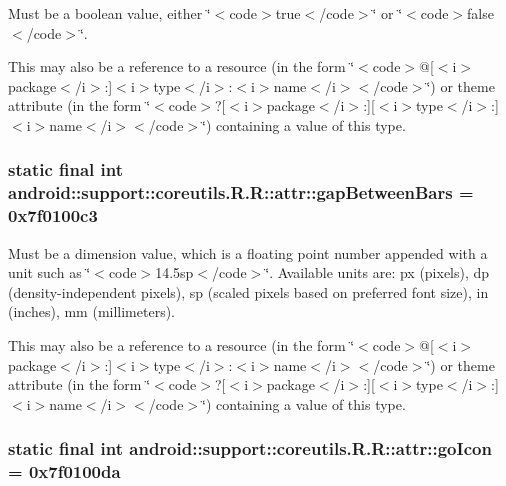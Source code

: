 Must be a boolean value, either \char`\"{}$<$code$>$true$<$/code$>$\char`\"{} or \char`\"{}$<$code$>$false$<$/code$>$\char`\"{}. 

This may also be a reference to a resource (in the form \char`\"{}$<$code$>$@\mbox{[}$<$i$>$package$<$/i$>$:\mbox{]}$<$i$>$type$<$/i$>$:$<$i$>$name$<$/i$>$$<$/code$>$\char`\"{}) or theme attribute (in the form \char`\"{}$<$code$>$?\mbox{[}$<$i$>$package$<$/i$>$:\mbox{]}\mbox{[}$<$i$>$type$<$/i$>$:\mbox{]}$<$i$>$name$<$/i$>$$<$/code$>$\char`\"{}) containing a value of this type. \hypertarget{classandroid_1_1support_1_1coreutils_1_1_r_1_1attr_387aafc8cc5a6e4f98bfead340496098}{
\subsubsection[{gapBetweenBars}]{\setlength{\rightskip}{0pt plus 5cm}static final int android::support::coreutils.R.R::attr::gapBetweenBars = 0x7f0100c3}}
\label{classandroid_1_1support_1_1coreutils_1_1_r_1_1attr_387aafc8cc5a6e4f98bfead340496098}


Must be a dimension value, which is a floating point number appended with a unit such as \char`\"{}$<$code$>$14.5sp$<$/code$>$\char`\"{}. Available units are: px (pixels), dp (density-independent pixels), sp (scaled pixels based on preferred font size), in (inches), mm (millimeters). 

This may also be a reference to a resource (in the form \char`\"{}$<$code$>$@\mbox{[}$<$i$>$package$<$/i$>$:\mbox{]}$<$i$>$type$<$/i$>$:$<$i$>$name$<$/i$>$$<$/code$>$\char`\"{}) or theme attribute (in the form \char`\"{}$<$code$>$?\mbox{[}$<$i$>$package$<$/i$>$:\mbox{]}\mbox{[}$<$i$>$type$<$/i$>$:\mbox{]}$<$i$>$name$<$/i$>$$<$/code$>$\char`\"{}) containing a value of this type. \hypertarget{classandroid_1_1support_1_1coreutils_1_1_r_1_1attr_f78015b53dcea0b88ea68130f3258f1e}{
\subsubsection[{goIcon}]{\setlength{\rightskip}{0pt plus 5cm}static final int android::support::coreutils.R.R::attr::goIcon = 0x7f0100da}}
\label{classandroid_1_1support_1_1coreutils_1_1_r_1_1attr_f78015b53dcea0b88ea68130f3258f1e}


